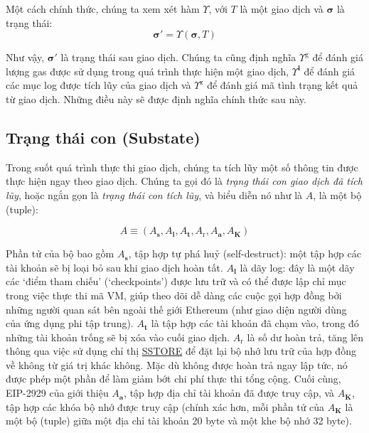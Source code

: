 \documentclass[9pt,oneside]{amsart}
\begin{document}
\begin{multicols}{2}
Một cách chính thức, chúng ta xem xét hàm \hyperlink{Upsilon_state_transition}{$\Upsilon$}, với $T$ là một giao dịch và $\boldsymbol{\sigma}$ là trạng thái:
\begin{equation}
\boldsymbol{\sigma}' = \Upsilon(\boldsymbol{\sigma}, T)
\end{equation}

Như vậy, $\boldsymbol{\sigma}'$ là trạng thái sau giao dịch. Chúng ta cũng định nghĩa \hyperlink{tx_total_gas_used_Upsilon_pow_g}{$\Upsilon^{\mathrm{g}}$} để đánh giá lượng gas được sử dụng trong quá trình thực hiện một giao dịch, \hyperlink{tx_logs_Upsilon_pow_l}{$\Upsilon^{\mathbf{l}}$} để đánh giá các mục log được tích lũy của giao dịch và \hyperlink{tx_status_Upsilon_pow_z}{$\Upsilon^{\mathrm{z}}$} để đánh giá mã tình trạng kết quả từ giao dịch. Những điều này sẽ được định nghĩa chính thức sau này.

\subsection{Trạng thái con (Substate)} \label{ch:substate}
Trong suốt quá trình thực thi giao dịch, chúng ta tích lũy một số thông tin được thực hiện ngay theo giao dịch. Chúng ta gọi đó là \textit{trạng thái con giao dịch đã tích lũy}, hoặc ngắn gọn là \textit{trạng thái con tích lũy}, và biểu diễn nó như là $A$, là một bộ (tuple):

\begin{equation}
A \equiv (A_{\mathbf{s}}, A_{\mathbf{l}}, A_{\mathbf{t}}, A_{\mathrm{r}}, A_{\mathbf{a}}, A_{\mathbf{K}})
\end{equation}

\hypertarget{self_destruct_set_wordy_defn_A__s}{}Phần tử của bộ bao gồm $A_{\mathbf{s}}$, tập hợp tự phá huỷ (self-destruct): một tập hợp các tài khoản sẽ bị loại bỏ sau khi giao dịch hoàn tất.
\hypertarget{tx_log_series_wordy_defn_A__l}{}$A_{\mathbf{l}}$ là dãy log: đây là một dãy các `điểm tham chiếu' (`checkpoints') được lưu trữ và có thể được lập chỉ mục trong việc thực thi mã VM, giúp theo dõi dễ dàng các cuộc gọi hợp đồng bởi những người quan sát bên ngoài thế giới Ethereum (như giao diện người dùng của ứng dụng phi tập trung).
\hypertarget{tx_touched_accounts_wordy_defn_A__t}{}$A_{\mathbf{t}}$ là tập hợp các tài khoản đã chạm vào, trong đó những tài khoản trống sẽ bị xóa vào cuối giao dịch.
\hypertarget{refund_balance_defn_words_A__r}{}$A_{\mathrm{r}}$ là số dư hoàn trả, tăng lên thông qua việc sử dụng chỉ thị \hyperlink{SSTORE}{{\small SSTORE}} để đặt lại bộ nhớ lưu trữ của hợp đồng về không từ giá trị khác không. Mặc dù không được hoàn trả ngay lập tức, nó được phép một phần để làm giảm bớt chi phí thực thi tổng cộng.
Cuối cùng, EIP-2929 của \cite{EIP-2929} giới thiệu \hypertarget{accessed_addresses_defn_words_A__a}{}$A_{\mathbf{a}}$, tập hợp địa chỉ tài khoản đã được truy cập, và \hypertarget{accessed_storage_keys_defn_words_A__k}{}$A_{\mathbf{K}}$, tập hợp các khóa bộ nhớ được truy cập (chính xác hơn, mỗi phần tử của $A_{\mathbf{K}}$ là một bộ (tuple) giữa một địa chỉ tài khoản 20 byte và một khe bộ nhớ 32 byte).


\end{multicols}
\end{document}
